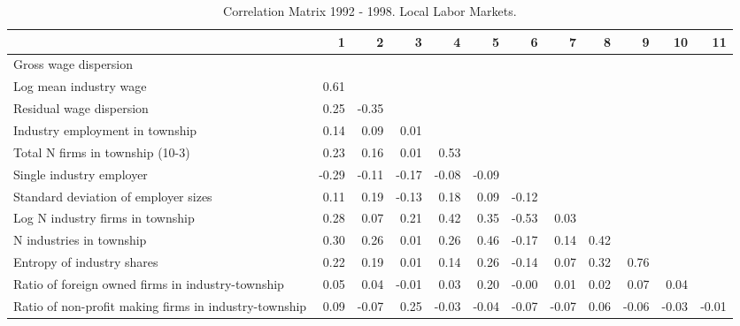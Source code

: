 \begin{table}[htb]
\centering
\caption{Correlation Matrix 1992 - 1998. Local Labor Markets.} 
\begin{tabular}{lrrrrrrrrrrr}
  \hline
 & 1 & 2 & 3 & 4 & 5 & 6 & 7 & 8 & 9 & 10 & 11 \\ 
  \hline
Gross wage dispersion &  &  &  &  &  &  &  &  &  &  &  \\ 
  Log mean industry wage & 0.61 &  &  &  &  &  &  &  &  &  &  \\ 
  Residual wage dispersion & 0.25 & -0.35 &  &  &  &  &  &  &  &  &  \\ 
  Industry employment in township & 0.14 & 0.09 & 0.01 &  &  &  &  &  &  &  &  \\ 
  Total N firms in township (10-3) & 0.23 & 0.16 & 0.01 & 0.53 &  &  &  &  &  &  &  \\ 
  Single industry employer & -0.29 & -0.11 & -0.17 & -0.08 & -0.09 &  &  &  &  &  &  \\ 
  Standard deviation of employer sizes & 0.11 & 0.19 & -0.13 & 0.18 & 0.09 & -0.12 &  &  &  &  &  \\ 
  Log N industry firms in township & 0.28 & 0.07 & 0.21 & 0.42 & 0.35 & -0.53 & 0.03 &  &  &  &  \\ 
  N industries in township & 0.30 & 0.26 & 0.01 & 0.26 & 0.46 & -0.17 & 0.14 & 0.42 &  &  &  \\ 
  Entropy of industry shares & 0.22 & 0.19 & 0.01 & 0.14 & 0.26 & -0.14 & 0.07 & 0.32 & 0.76 &  &  \\ 
  Ratio of foreign owned firms in industry-township & 0.05 & 0.04 & -0.01 & 0.03 & 0.20 & -0.00 & 0.01 & 0.02 & 0.07 & 0.04 &  \\ 
  Ratio of non-profit making firms in industry-township & 0.09 & -0.07 & 0.25 & -0.03 & -0.04 & -0.07 & -0.07 & 0.06 & -0.06 & -0.03 & -0.01 \\ 
   \hline
\end{tabular}
\end{table}

